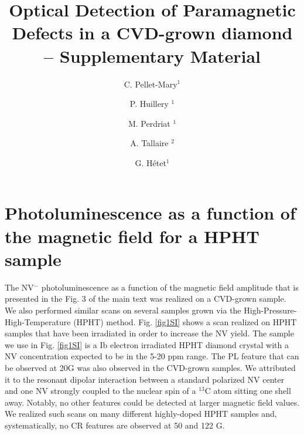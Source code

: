 \documentclass[9pt,twocolumn,twoside]{revtex4-1}
\begin{document}
\title{Optical Detection of Paramagnetic Defects in a CVD-grown diamond\\-- Supplementary Material}

\author{C. Pellet-Mary$^{1}$}
\author{P. Huillery $^{1}$}
\author{M. Perdriat $^{1}$}
\author{A. Tallaire $^{2}$}
\author{G. H\'etet$^{1}$} 



\maketitle

\section{Photoluminescence as a function of the magnetic field for a HPHT sample}

The NV$^-$ photoluminescence as a function of the magnetic field amplitude that is presented in the Fig. 3 of the main text was realized on a CVD-grown sample. 
We also performed similar scans on several samples grown via the High-Pressure-High-Temperature (HPHT) method. 
Fig. \ref{fig1SI} shows a scan realized on HPHT samples that have been irradiated in order to increase the NV yield. 
The sample we use in Fig. \ref{fig1SI} is a Ib electron irradiated HPHT diamond crystal with a NV concentration expected to be in the 5-20 ppm range.
The PL feature that can be observed at 20G was also observed in the CVD-grown samples. We attributed it to the resonant dipolar interaction between a standard polarized NV center and one NV strongly coupled to the nuclear spin of a $^{13}$C atom sitting one shell away.
Notably, no other features could be detected at larger magnetic field values. We realized such scans on many different highly-doped HPHT samples and, systematically, no CR features are observed at 50 and 122 G. 
\end{document}
